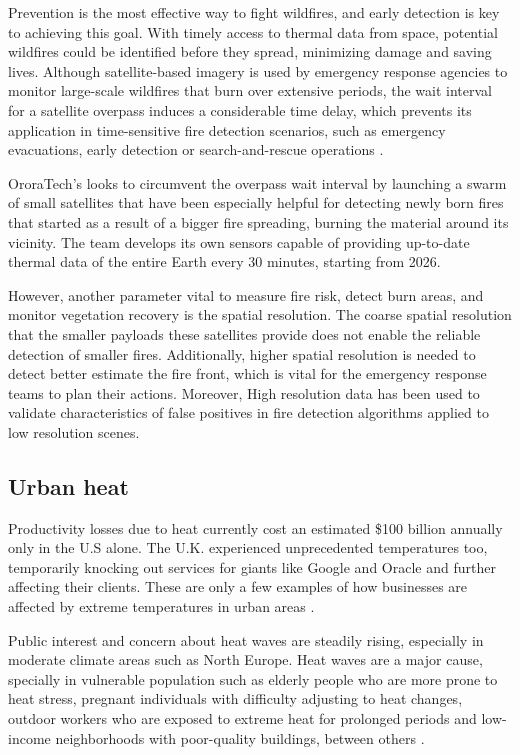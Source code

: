     Prevention is the most effective way to fight wildfires, and early detection is key to achieving this goal. 
    With timely access to thermal data from space, potential wildfires could be identified before they spread, minimizing damage and saving lives.
    Although satellite-based imagery is used by emergency response agencies to monitor large-scale wildfires that burn over extensive periods, the wait interval for a satellite overpass induces a considerable time delay, which prevents its application in time-sensitive fire detection scenarios, such as emergency evacuations, early detection or search-and-rescue operations \cite{lippitt2015time}. 

    OroraTech's looks to circumvent the overpass wait interval by launching a swarm of small satellites that have  been especially helpful for detecting newly born fires that started as a result of a bigger fire spreading, burning the material around its vicinity. The team develops its own sensors capable of providing up-to-date thermal data of the entire Earth every 30 minutes, starting from 2026.
    
    However, another parameter vital to measure fire risk, detect burn areas, and monitor vegetation recovery is the spatial resolution. The coarse spatial resolution that the smaller payloads these satellites provide does not enable the reliable detection of smaller fires. Additionally, higher spatial resolution is needed to detect better estimate the fire front, which is vital for the emergency response teams to plan their actions.
    Moreover, High resolution data has been used to validate characteristics of false positives in fire detection algorithms applied to low resolution scenes\cite{ijgi11120601}. 



    \subsection{Urban heat}

    Productivity losses due to heat currently cost an estimated \$100 billion annually only in the U.S alone.
    The U.K. experienced unprecedented temperatures too, temporarily knocking out services for giants like Google and Oracle and further affecting their clients.
    These are only a few examples of how businesses are affected by extreme temperatures in urban areas \cite{atlanticcouncil2021extreme}.  

    Public interest and concern about heat waves are steadily rising, especially in moderate climate areas such as North Europe. Heat waves are a major cause, specially in vulnerable population such as elderly people who are more prone to heat stress, pregnant individuals with difficulty adjusting to heat changes, outdoor workers who are exposed to extreme heat for prolonged periods and low-income neighborhoods with poor-quality buildings, between others \cite{Hsu2021Disproportionate}.   

